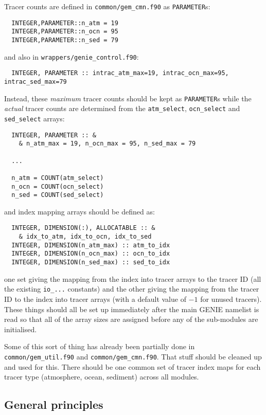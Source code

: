 \documentclass[a4paper,10pt,article]{memoir}
\begin{document}
Tracer counts are defined in \texttt{common/gem\_cmn.f90} as
\texttt{PARAMETER}s:
\begin{verbatim}
  INTEGER,PARAMETER::n_atm = 19
  INTEGER,PARAMETER::n_ocn = 95
  INTEGER,PARAMETER::n_sed = 79
\end{verbatim}
and also in \texttt{wrappers/genie\_control.f90}:
\begin{verbatim}
  INTEGER, PARAMETER :: intrac_atm_max=19, intrac_ocn_max=95, intrac_sed_max=79
\end{verbatim}
Instead, these \emph{maximum} tracer counts should be kept as
\texttt{PARAMETER}s while the \emph{actual} tracer counts are
determined from the \texttt{atm\_select}, \texttt{ocn\_select} and
\texttt{sed\_select} arrays:
\begin{verbatim}
  INTEGER, PARAMETER :: &
    & n_atm_max = 19, n_ocn_max = 95, n_sed_max = 79

  ...

  n_atm = COUNT(atm_select)
  n_ocn = COUNT(ocn_select)
  n_sed = COUNT(sed_select)
\end{verbatim}
and index mapping arrays should be defined as:
\begin{verbatim}
  INTEGER, DIMENSION(:), ALLOCATABLE :: &
    & idx_to_atm, idx_to_ocn, idx_to_sed
  INTEGER, DIMENSION(n_atm_max) :: atm_to_idx
  INTEGER, DIMENSION(n_ocn_max) :: ocn_to_idx
  INTEGER, DIMENSION(n_sed_max) :: sed_to_idx
\end{verbatim}
one set giving the mapping from the index into tracer arrays to the
tracer ID (all the existing \texttt{io\_...} constants) and the other
giving the mapping from the tracer ID to the index into tracer arrays
(with a default value of $-1$ for unused tracers).  These things
should all be set up immediately after the main GENIE namelist is read
so that all of the array sizes are assigned before any of the
sub-modules are initialised.

Some of this sort of thing has already been partially done in
\texttt{common/gem\_util.f90} and \texttt{common/gem\_cmn.f90}.  That
stuff should be cleaned up and used for this.  There should be one
common set of tracer index maps for each tracer type (atmosphere,
ocean, sediment) across all modules.



\subsection*{General principles}
\end{document}

